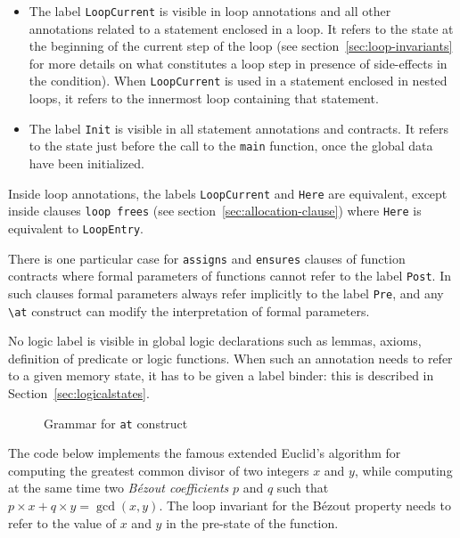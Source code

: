 \begin{itemize}
\item The label \lstinline|LoopCurrent|
is visible in loop annotations and
all other annotations related to a statement enclosed in a loop.
It refers to the state at the beginning of the current step of the loop (see
section~\ref{sec:loop-invariants} for more details on what constitutes a loop
step in presence of side-effects in the condition). When
\lstinline|LoopCurrent| is used in a statement enclosed in nested loops, it
refers to the innermost loop containing that statement.

\item The label \lstinline|Init| is visible in all statement annotations and 
contracts. It refers to the state just before the call to the \lstinline|main| 
function, once the global data have been initialized.
\end{itemize}

Inside loop annotations, the labels \lstinline|LoopCurrent| and 
\lstinline|Here| are equivalent,
except inside clauses \lstinline|loop frees|
(see section~\ref{sec:allocation-clause}) 
where \lstinline|Here| is equivalent to \lstinline|LoopEntry|.

There is one particular case for \lstinline|assigns| and \lstinline|ensures|
clauses of function contracts where formal parameters
of functions cannot refer to the label \lstinline|Post|.
In such clauses formal parameters always refer implicitly to the label
\lstinline|Pre|, and any \lstinline|\at| construct can modify the
interpretation of formal parameters.

No logic label is visible in global logic declarations
such as lemmas, axioms, definition of predicate or logic
functions. When such an annotation needs to refer to a given memory
state, it has to be given a label binder: this is described in
Section~\ref{sec:logicalstates}.

\begin{figure}[t]
  \begin{cadre}
    
  \end{cadre}
  \caption{Grammar for \lstinline|at| construct}
  \label{fig:gram:at}
\end{figure}


\begin{example}
  The code below implements the famous extended Euclid's algorithm
  for computing the greatest common divisor of two integers $x$ and
  $y$, while computing at the same time two \emph{B\'ezout coefficients} $p$
  and $q$ such that $p\times x+q\times y = \gcd(x,y)$.
  The loop invariant for the B\'ezout property needs to refer to the
  value of $x$ and $y$ in the pre-state of the function.
\end{example}

